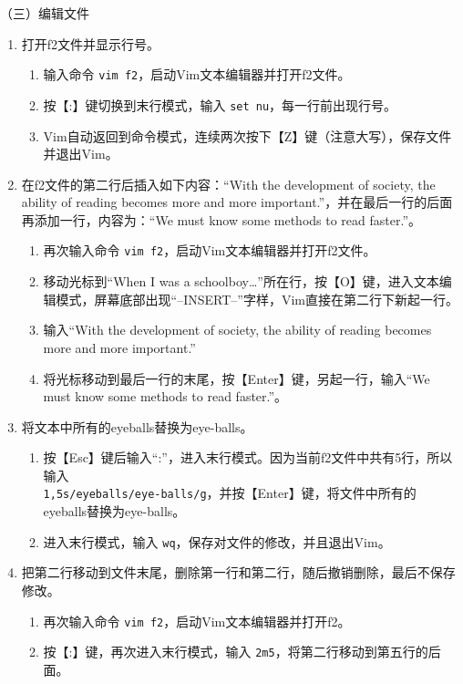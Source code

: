 \vspace{0.1in}
（三）编辑文件
\begin{enumerate}
  \item 打开f2文件并显示行号。
    \begin{enumerate}
      \item 输入命令 \verb|vim f2|，启动Vim文本编辑器并打开f2文件。
      \item 按【:】键切换到末行模式，输入 \verb|set nu|，每一行前出现行号。
      \item Vim自动返回到命令模式，连续两次按下【Z】键（注意大写），保存文件并退出Vim。
    \end{enumerate}
  \item 在f2文件的第二行后插入如下内容：“With the development of society, the ability of reading becomes more and more important.”，并在最后一行的后面再添加一行，内容为：“We must know some methods to read faster.”。
    \begin{enumerate}
      \item 再次输入命令 \verb|vim f2|，启动Vim文本编辑器并打开f2文件。
      \item 移动光标到“When I was a schoolboy…”所在行，按【O】键，进入文本编辑模式，屏幕底部出现“--INSERT--”字样，Vim直接在第二行下新起一行。
      \item 输入“With the development of society, the ability of reading becomes more and more important.”
      \item 将光标移动到最后一行的末尾，按【Enter】键，另起一行，输入“We must know some methods to read faster.”。
    \end{enumerate}
  \item 将文本中所有的eyeballs替换为eye-balls。
    \begin{enumerate}
      \item
	按【Esc】键后输入“:”，进入末行模式。因为当前f2文件中共有5行，所以输入\\ \verb|1,5s/eyeballs/eye-balls/g|，并按【Enter】键，将文件中所有的eyeballs替换为eye-balls。
      \item 进入末行模式，输入 \verb|wq|，保存对文件的修改，并且退出Vim。
    \end{enumerate}
  \item 把第二行移动到文件末尾，删除第一行和第二行，随后撤销删除，最后不保存修改。
    \begin{enumerate}
      \item 再次输入命令 \verb|vim f2|，启动Vim文本编辑器并打开f2。
      \item 按【:】键，再次进入末行模式，输入 \verb|2m5|，将第二行移动到第五行的后面。

\end{enumerate}
\end{enumerate}
